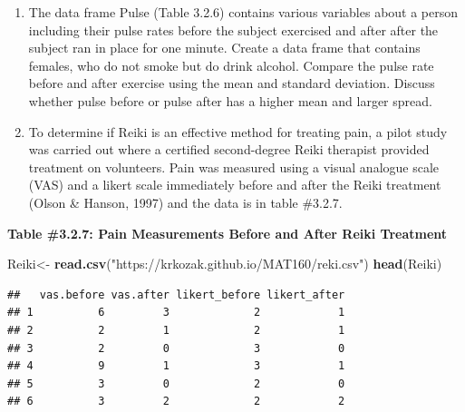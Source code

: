 \documentclass[]{book}
\newenvironment{Shaded}{\begin{snugshade}}{\end{snugshade}}
\newcommand{\KeywordTok}[1]{\textcolor[rgb]{0.13,0.29,0.53}{\textbf{#1}}}
\newcommand{\NormalTok}[1]{#1}
\newcommand{\OperatorTok}[1]{\textcolor[rgb]{0.81,0.36,0.00}{\textbf{#1}}}
\newcommand{\StringTok}[1]{\textcolor[rgb]{0.31,0.60,0.02}{#1}}
\begin{document}
\begin{Shaded}
\end{Shaded}

\begin{enumerate}
\def\labelenumi{\arabic{enumi}.}
\setcounter{enumi}{5}
\item
  The data frame Pulse (Table 3.2.6) contains various variables about a person including their pulse rates before the subject exercised and after after the subject ran in place for one minute. Create a data frame that contains females, who do not smoke but do drink alcohol. Compare the pulse rate before and after exercise using the mean and standard deviation. Discuss whether pulse before or pulse after has a higher mean and larger spread.
\item
  To determine if Reiki is an effective method for treating pain, a pilot study was carried out where a certified second-degree Reiki therapist provided treatment on volunteers. Pain was measured using a visual analogue scale (VAS) and a likert scale immediately before and after the Reiki treatment (Olson \& Hanson, 1997) and the data is in table \#3.2.7.
\end{enumerate}

\textbf{Table \#3.2.7: Pain Measurements Before and After Reiki Treatment}

\begin{Shaded}
\begin{Highlighting}[]
\NormalTok{Reiki<-}\StringTok{ }\KeywordTok{read.csv}\NormalTok{(}\StringTok{"https://krkozak.github.io/MAT160/reki.csv"}\NormalTok{)}
\KeywordTok{head}\NormalTok{(Reiki)}
\end{Highlighting}
\end{Shaded}

\begin{verbatim}
##   vas.before vas.after likert_before likert_after
## 1          6         3             2            1
## 2          2         1             2            1
## 3          2         0             3            0
## 4          9         1             3            1
## 5          3         0             2            0
## 6          3         2             2            2
\end{verbatim}
\end{document}
